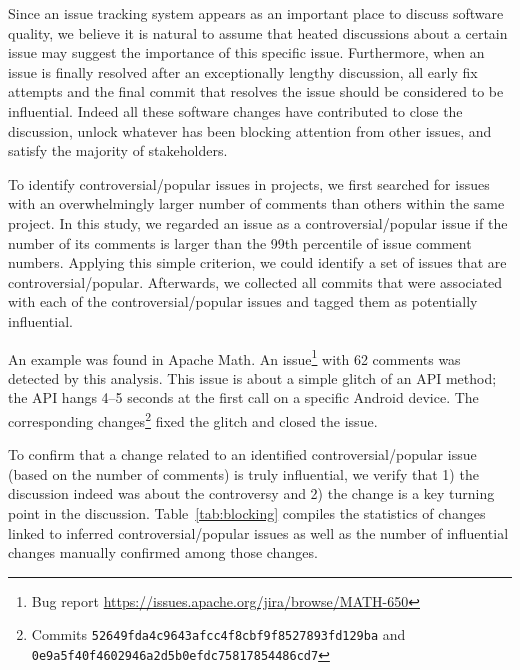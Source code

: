 Since an issue tracking system appears as an important place to discuss
software quality, we believe it is natural to assume that heated
discussions about a certain issue may suggest the importance of this
specific issue. Furthermore, when an issue is finally resolved after an exceptionally
lengthy discussion, all early fix attempts and the final commit that resolves
the issue should be considered to be influential. Indeed all these
software changes have contributed to close the discussion, unlock whatever
has been blocking attention from other issues, and satisfy the majority of
stakeholders. 

To identify controversial/popular issues in projects, we first searched for
issues with an overwhelmingly larger number of comments than others within the
same project. In this study, we regarded an issue as a controversial/popular issue if the
number of its comments is larger than the 99th percentile of issue comment
numbers. Applying this simple criterion, we could identify a set of issues that
 are controversial/popular. Afterwards, we collected all commits that were
associated with each of the controversial/popular issues and tagged them as potentially
influential.



An example was found in Apache Math. An
issue\footnote{Bug report \url{https://issues.apache.org/jira/browse/MATH-650}} with 62
comments was detected by this analysis. This issue is about a simple glitch of
an API method; the API hangs 4--5 seconds at the first call on a specific
Android device. The corresponding
changes\footnote{Commits {\tt\small 52649fda4c9643afcc4f8cbf9f8527893fd129ba} and\\
{\tt\small 0e9a5f40f4602946a2d5b0efdc75817854486cd7}} fixed the glitch and
closed the issue.

To confirm that a change related to an identified controversial/popular issue (based on the number of comments) is truly influential,
we verify that 1) the discussion indeed was about the controversy and 2) the change is a key turning point in the discussion.
Table~\ref{tab:blocking}
compiles the statistics of changes linked to inferred controversial/popular issues as well as 
the number of influential changes manually confirmed among those changes.

